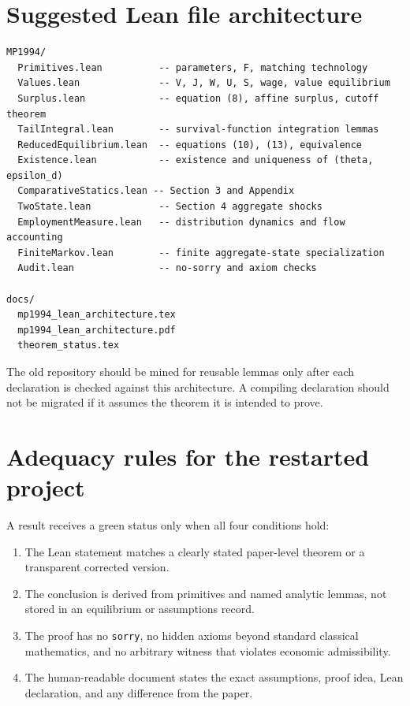 \documentclass[11pt]{article}
\begin{document}
\section{Suggested Lean file architecture}

\begin{verbatim}
MP1994/
  Primitives.lean          -- parameters, F, matching technology
  Values.lean              -- V, J, W, U, S, wage, value equilibrium
  Surplus.lean             -- equation (8), affine surplus, cutoff theorem
  TailIntegral.lean        -- survival-function integration lemmas
  ReducedEquilibrium.lean  -- equations (10), (13), equivalence
  Existence.lean           -- existence and uniqueness of (theta, epsilon_d)
  ComparativeStatics.lean -- Section 3 and Appendix
  TwoState.lean            -- Section 4 aggregate shocks
  EmploymentMeasure.lean   -- distribution dynamics and flow accounting
  FiniteMarkov.lean        -- finite aggregate-state specialization
  Audit.lean               -- no-sorry and axiom checks

docs/
  mp1994_lean_architecture.tex
  mp1994_lean_architecture.pdf
  theorem_status.tex
\end{verbatim}

The old repository should be mined for reusable lemmas only after each declaration is checked against this architecture. A compiling declaration should not be migrated if it assumes the theorem it is intended to prove.

\section{Adequacy rules for the restarted project}

A result receives a green status only when all four conditions hold:

\begin{enumerate}
\item The Lean statement matches a clearly stated paper-level theorem or a transparent corrected version.
\item The conclusion is derived from primitives and named analytic lemmas, not stored in an equilibrium or assumptions record.
\item The proof has no \texttt{sorry}, no hidden axioms beyond standard classical mathematics, and no arbitrary witness that violates economic admissibility.
\item The human-readable document states the exact assumptions, proof idea, Lean declaration, and any difference from the paper.
\end{enumerate}
\end{document}

